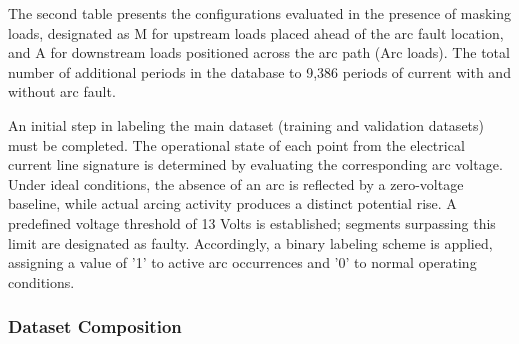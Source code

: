 \documentclass[journal,article,submit,moreauthors]{Definitions/mdpi}
\begin{document}
The second table presents the configurations evaluated in the presence of masking loads, designated as M for upstream loads placed ahead of the arc fault location, and A for downstream loads positioned across the arc path (Arc loads). The total number of additional periods in the database to 9,386 periods of current with and without arc fault.



\begin{table}[htbp]
\centering
\caption{Experimental test configurations with masking loads ($M$ for upstream, $A$ for downstream).}
\label{tab:masking_configurations}
\end{table}

An initial step in labeling the main dataset (training and validation datasets) must be completed. The operational state of each point from the electrical current line signature is determined by evaluating the corresponding arc voltage. Under ideal conditions, the absence of an arc is reflected by a zero-voltage baseline, while actual arcing activity produces a distinct potential rise. A predefined voltage threshold of 13 Volts is established; segments surpassing this limit are designated as faulty. Accordingly, a binary labeling scheme is applied, assigning a value of '1' to active arc occurrences and '0' to normal operating conditions.

\subsubsection{Dataset Composition}
\label{sec:dataset_composition}
\end{document}
